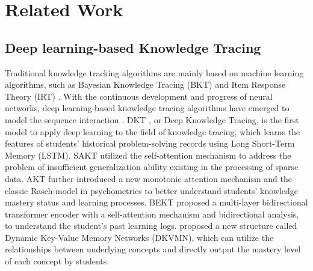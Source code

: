 \section{Related Work}
\label{sect:related work}
\subsection{Deep learning-based Knowledge Tracing}
Traditional knowledge tracking algorithms are mainly based on machine learning algorithms, such as Bayesian Knowledge Tracing (BKT) \cite{BKT} and Item Response Theory (IRT) \cite{IRT}. 
With the continuous development and progress of neural networks, deep learning-based knowledge tracing algorithms have emerged to model the sequence interaction \cite{DKT,MRT-KT,LPKT,AdaptKT}. 
DKT \cite{DKT}, or Deep Knowledge Tracing, is the first model to apply deep learning to the field of knowledge tracing, which learns the features of students' historical problem-solving records using Long Short-Term Memory (LSTM). 
SAKT \cite{SAKT} utilized the self-attention mechanism to address the problem of insufficient generalization ability existing in the processing of sparse data. 
AKT \cite{AKT} further introduced a new monotonic attention mechanism and the classic Rasch-model in psychometrics to better understand students' knowledge mastery status and learning processes.
BEKT \cite{BEKT} proposed a multi-layer bidirectional transformer encoder with a self-attention mechanism and bidirectional analysis, to understand the student's past learning logs.
\citet{DKVMN} proposed a new structure called Dynamic Key-Value Memory Networks (DKVMN), which can utilize the relationships between underlying concepts and directly output the mastery level of each concept by students.  

